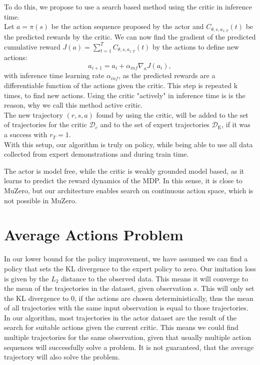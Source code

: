 To do this, we propose to use 
a search based method using the critic in inference time. \\
Let $a = \pi(s)$ be the action sequence proposed by the actor and $C_{\theta, s, a_{1:T}}(t)$ be the predicted rewards by the critic. 
We can now find the gradient of the predicted cumulative reward $J(a) = \sum_{t=1}^{T} C_{\theta, s, a_{1:T}}(t)$ by the actions to define new actions: 
$$a_{i+1} = a_i + \alpha_{inf} \nabla_{a} J(a_i),$$ 
with inference time learning rate $\alpha_{inf}$, as the predicted rewards are a differentiable function of the actions given the critic. This step is repeated k times, to find new actions. 
Using the critic "actively" in inference time is is the reason, why we call this method active critic.\\ 

The new trajectory $(r, s, a)$ found by using the critic, will 
be added to the set of trajectories for the critic $\mathcal{D}_c$ and to the set of expert trajectories $\mathcal{D}_{\text{E}}$, if it was a success with $r_T = 1$. \\

With this setup, our algorithm is truly on policy, while being able to use all data collected from expert demonstrations and during train time. 

The actor is model free, while the critic is weakly grounded model based, as it learns to predict the reward dynamics of the MDP. In this sense, it is close to MuZero, 
but our architecture enables search on continuous action space, which is not possible in MuZero. 

\section{Average Actions Problem}
\label{avr_action_problem}
In our lower bound for the policy improvement, we have assumed we can find a policy that sets the KL divergence to the expert policy to zero. Our imitation loss is given by the $L_2$ distance to the 
observed data. This means it will converge to the mean of the trajectories in the dataset, given observation $s$. This will only set the KL divergence to 0, if the actions are chosen deterministically, 
thus the mean of all trajectories with the same input observation is equal to those trajectories.\\

In our algorithm, most trajectories in the actor dataset are the result of the search for suitable actions given the current critic. This means we could find
multiple trajectories for the same observation, given that usually multiple action sequences will successfully solve a problem. It is not guaranteed, that the 
average trajectory will also solve the problem.\\ 

